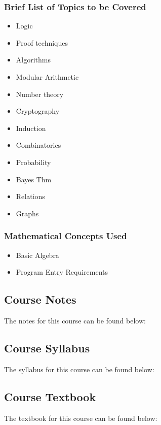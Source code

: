 {\begin{highlight}[\CSPBDisc]
        \subsubsection*{Brief List of Topics to be Covered}
    
        \begin{itemize}
            \item Logic
            \item Proof techniques
            \item Algorithms
            \item Modular Arithmetic
            \item Number theory
            \item Cryptography
            \item Induction
            \item Combinatorics
            \item Probability
            \item Bayes Thm
            \item Relations
            \item Graphs
        \end{itemize}
    
        \subsubsection*{Mathematical Concepts Used}
    
        \begin{itemize}
            \item Basic Algebra
            \item Program Entry Requirements
        \end{itemize}
    \end{highlight}
}

\subsection{Course Notes}

The notes for this course can be found below: \coursedoc{\CSPBDiscreteCourseNotes}

\subsection{Course Syllabus}

The syllabus for this course can be found below: \coursedoc{\CSPBDiscreteSyllabus}

\subsection{Course Textbook}

The textbook for this course can be found below: \coursedoc{\CSPBDiscreteTextbook}